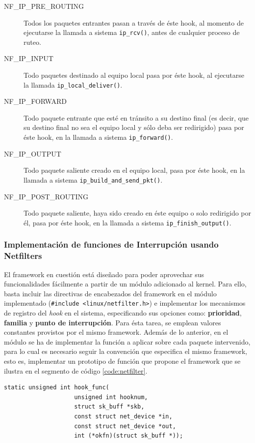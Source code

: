 \begin{description}
\item[NF\_IP\_PRE\_ROUTING] Todos los paquetes entrantes pasan a través de éste hook, al momento de ejecutarse la llamada a sistema \verb=ip_rcv()=, antes de cualquier proceso de ruteo.
\item[NF\_IP\_INPUT] Todo paquetes destinado al equipo local pasa por éste hook, al ejecutarse la llamada \verb=ip_local_deliver()=.
\item[NF\_IP\_FORWARD] Todo paquete entrante que esté en tránsito a su destino final (es decir, que su destino final no sea el equipo local y sólo deba ser redirigido) pasa por éste hook, en la llamada a sistema \verb=ip_forward()=.
\item[NF\_IP\_OUTPUT] Todo paquete saliente creado en el equipo local, pasa por éste hook, en la llamada a sistema \verb=ip_build_and_send_pkt()=.
\item[NF\_IP\_POST\_ROUTING] Todo paquete saliente, haya sido creado en éste equipo o solo redirigido por él, pasa por éste hook, en la llamada a sistema \verb=ip_finish_output()=.
\end{description}

\subsubsection{Implementación de funciones de Interrupción usando Netfilters}
El framework en cuestión está diseñado para poder aprovechar sus funcionalidades fácilmente a partir de un módulo adicionado al kernel. Para ello, basta incluir las directivas de encabezados del framework en el módulo implementado (\verb=#include <linux/netfilter.h>=) e implementar los mecanismos de registro del \emph{hook} en el sistema, especificando sus opciones como: \textbf{prioridad}, \textbf{familia} y \textbf{punto de interrupción}. Para ésta tarea, se emplean valores constantes provistos por el mismo framework. Además de lo anterior, en el módulo se ha de implementar la función a aplicar sobre cada paquete intervenido, para lo cual es necesario seguir la convención que especifica el mismo framework, esto es, implementar un prototipo de función que propone el framework que se ilustra en el segmento de código \ref{code:netfilter}.

\vspace{1pc}
\begin{lstlisting}[style=CInputStyle, label=code:netfilter, captionpos=b, caption={Prototipo de la función de interrupción a ser definida en un \emph{hook} de Netfilters.}]
static unsigned int hook_func(
            		unsigned int hooknum,
            		struct sk_buff *skb, 
            		const struct net_device *in, 
            		const struct net_device *out, 
            		int (*okfn)(struct sk_buff *));
\end{lstlisting}


